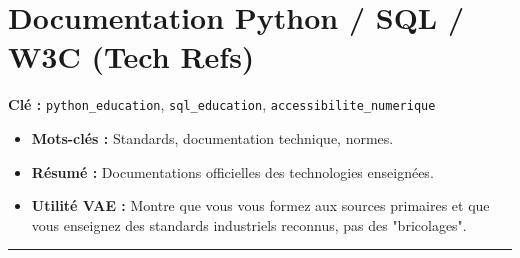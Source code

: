 \section{Documentation Python / SQL / W3C (Tech Refs)}
\textbf{Clé :} \texttt{python\_education}, \texttt{sql\_education}, \texttt{accessibilite\_numerique}
\begin{itemize}
    \item \textbf{Mots-clés :} Standards, documentation technique, normes.
    \item \textbf{Résumé :} Documentations officielles des technologies enseignées.
    \item \textbf{Utilité VAE :} Montre que vous vous formez aux sources primaires et que vous enseignez des standards industriels reconnus, pas des "bricolages".
\end{itemize}
\hrule
